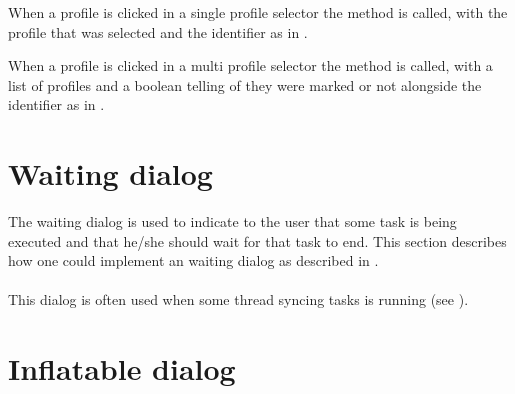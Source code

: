 

\noindent
When a profile is clicked in a single profile selector the  method is called, with the profile that was selected and the identifier  as in .



\noindent
When a profile is clicked in a multi profile selector the  method is called, with a list of profiles and a boolean telling of they were marked or not alongside the identifier  as in .

\section{Waiting dialog}
\label{sec:impl_waiting_dialog}

The waiting dialog is used to indicate to the user that some task is being executed and that he/she should wait for that task to end. This section describes how one could implement an waiting dialog as described in .
\\\\
This dialog is often used when some thread syncing tasks is running (see ).




\section{Inflatable dialog}
\label{sec:impl_inflatable_dialog}




